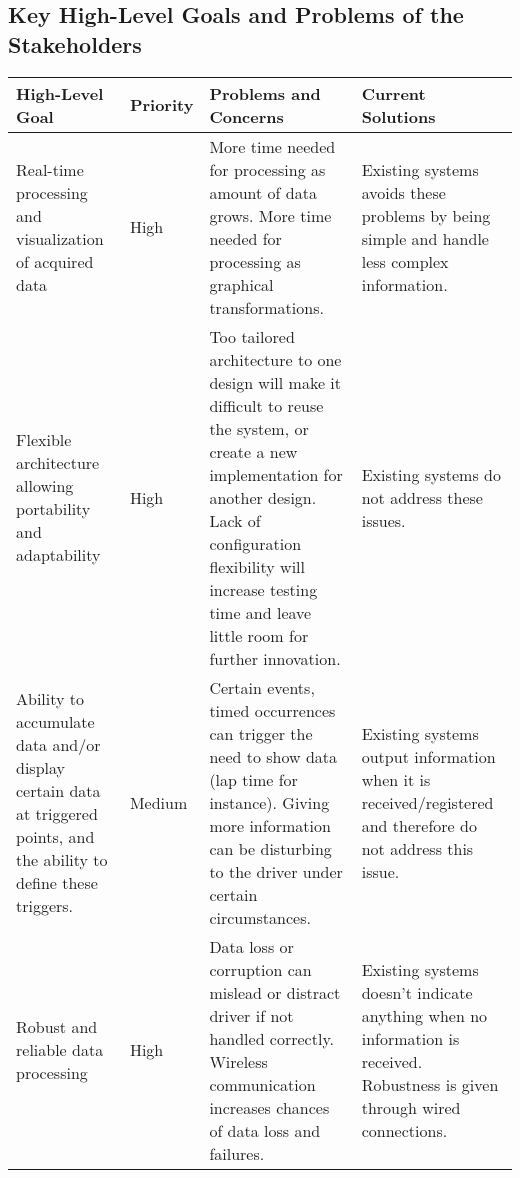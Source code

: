 \subsection{Key High-Level Goals and Problems of the Stakeholders}


\clearpage
\begin{table}\small
\begin{tabularx}{\textwidth}{|X|l|X|X|}
	\hline
	\rowcolor{gray!50}
	High-Level Goal & Priority & Problems and Concerns & Current Solutions \\
	\hline
	Real-time processing and visualization of acquired data 
		& High 
			& More time needed for processing as amount of data grows. \newline \newline More time needed for processing as graphical transformations. 
				
				& Existing systems avoids these problems by being simple and handle less
				complex information. \\
	\hline
	Flexible architecture allowing portability and adaptability
		& High
			& Too tailored architecture to one design will make it difficult to
				reuse the system, or create a new implementation for another design. \newline \newline Lack of configuration flexibility will increase testing time and leave
				little room for further innovation.
				& Existing systems do not address these issues. \\
	\hline
	Ability to accumulate data and/or display certain data at triggered points,
	and the ability to define these triggers.
		& Medium
			& Certain events, timed occurrences can trigger the need to show data (lap time for instance). \newline \newline Giving more information can be disturbing to the driver under certain circumstances.
				& Existing systems output information when it is received/registered and
				therefore do not address this issue.\\
	\hline
	Robust and reliable data processing
		& High
			& Data loss or corruption can mislead or distract driver if not handled correctly. \newline \newline Wireless communication increases chances of data loss and failures.
				& Existing systems doesn't indicate anything when no information is
				received. Robustness is given through wired connections. \\
	\hline
\end{tabularx}
\end{table}
